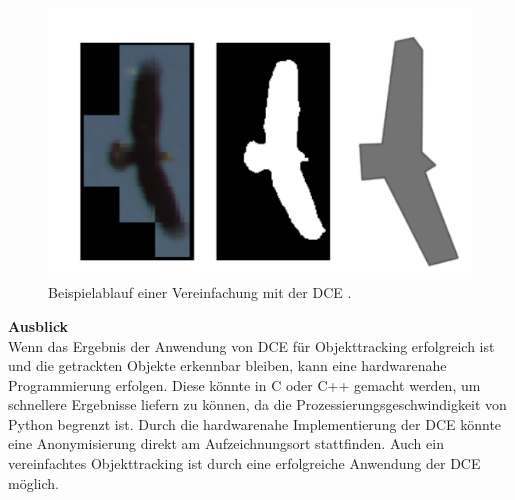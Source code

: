 \documentclass[a4paper,11pt,pdftex, parskip]{scrreprt}
\begin{document}
\begin{figure}[ht]
 \vspace{-0.5cm}
    \centering
    \includegraphics*[scale = 0.5, keepaspectratio, trim=2 2 2 2 ]{images/Example_bird.png}
    \caption[Beispielablauf der Segmentierung und DCE aus \citet{Dorr2017}]{Beispielablauf einer Vereinfachung mit der DCE \citep{Dorr2017}.}
    \label{Bsp_Dorr}
\end{figure}

{\bfseries \large Ausblick\\}
Wenn das Ergebnis der Anwendung von DCE für Objekttracking erfolgreich ist und die getrackten Objekte erkennbar bleiben, kann eine hardwarenahe Programmierung erfolgen. Diese könnte in C oder C++ gemacht werden, um schnellere Ergebnisse liefern zu können, da die Prozessierungsgeschwindigkeit von Python begrenzt ist.\newline
Durch die hardwarenahe Implementierung der DCE könnte eine Anonymisierung direkt am Aufzeichnungsort stattfinden. Auch ein vereinfachtes Objekttracking ist durch eine erfolgreiche Anwendung der DCE möglich.



\appendix






\end{document}
